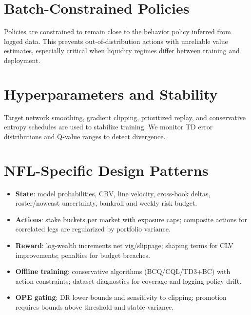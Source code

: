\section{Batch-Constrained Policies}
Policies are constrained to remain close to the behavior policy inferred from logged data. This prevents out‑of‑distribution actions with unreliable value estimates, especially critical when liquidity regimes differ between training and deployment.

\section{Hyperparameters and Stability}
Target network smoothing, gradient clipping, prioritized replay, and conservative entropy schedules are used to stabilize training. We monitor TD error distributions and Q‑value ranges to detect divergence.

\section{NFL-Specific Design Patterns}
\begin{itemize}
  \item \textbf{State}: model probabilities, CBV, line velocity, cross-book deltas, roster/nowcast uncertainty, bankroll and weekly risk budget.
  \item \textbf{Actions}: stake buckets per market with exposure caps; composite actions for correlated legs are regularized by portfolio variance.
  \item \textbf{Reward}: log-wealth increments net vig/slippage; shaping terms for CLV improvements; penalties for budget breaches.
  \item \textbf{Offline training}: conservative algorithms (BCQ/CQL/TD3+BC) with action constraints; dataset diagnostics for coverage and logging policy drift.
  \item \textbf{OPE gating}: DR lower bounds and sensitivity to clipping; promotion requires bounds above threshold and stable variance.
\end{itemize}

